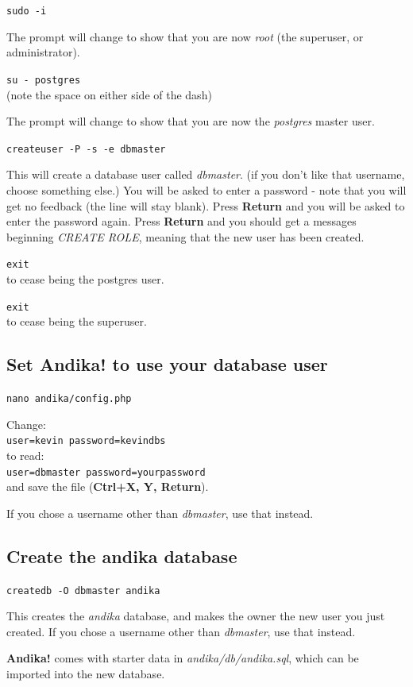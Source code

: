 \documentclass[a4paper,10pt, oneside]{book}
\begin{document}
\verb|sudo -i|

The prompt will change to show that you are now \textit{root} (the superuser, or administrator).

\verb|su - postgres|\\
(note the space on either side of the dash)

The prompt will change to show that you are now the \textit{postgres} master user.

\verb|createuser -P -s -e dbmaster|

This will create a database user called \textit{dbmaster}.  (if you don't like that username, choose something else.) You will be asked to enter a password - note that you will get no feedback (the line will stay blank).  Press \textbf{Return} and you will be asked to enter the password again.  Press \textbf{Return} and you should get a messages beginning \textit{CREATE ROLE}, meaning that the new user has been created.

\verb|exit|\\
to cease being the postgres user.

\verb|exit|\\
to cease being the superuser.


\subsection{Set Andika! to use your database user}

\verb|nano andika/config.php|

Change:\\
\verb|user=kevin password=kevindbs|\\
to read:\\
\verb|user=dbmaster password=yourpassword|\\
and save the file (\textbf{Ctrl+X, Y, Return}).

If you chose a username other than \textit{dbmaster}, use that instead.


\subsection{Create the andika database}

\verb|createdb -O dbmaster andika|

This creates the \textit{andika} database, and makes the owner the new user you just created.  If you chose a username other than \textit{dbmaster}, use that instead.

\textbf{Andika!} comes with starter data in \textit{andika/db/andika.sql}, which can be imported into the new database.
\end{document}
